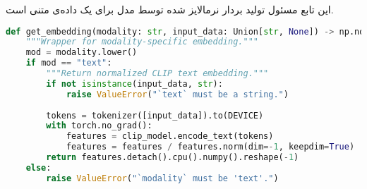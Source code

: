 \documentclass{article}
\begin{document}
این تابع مسئول تولید بردار  نرمالایز شده توسط مدل  برای یک داده‌ی متنی است.

\begin{latin}
\begin{lstlisting}[language=Python]
def get_embedding(modality: str, input_data: Union[str, None]) -> np.ndarray:
    """Wrapper for modality-specific embedding."""
    mod = modality.lower()
    if mod == "text":
        """Return normalized CLIP text embedding."""
        if not isinstance(input_data, str):
            raise ValueError("`text` must be a string.")
        
        tokens = tokenizer([input_data]).to(DEVICE)
        with torch.no_grad():
            features = clip_model.encode_text(tokens)
            features = features / features.norm(dim=-1, keepdim=True)
        return features.detach().cpu().numpy().reshape(-1)
    else:
        raise ValueError("`modality` must be 'text'.")
\end{lstlisting}
\end{latin}
\end{document}
